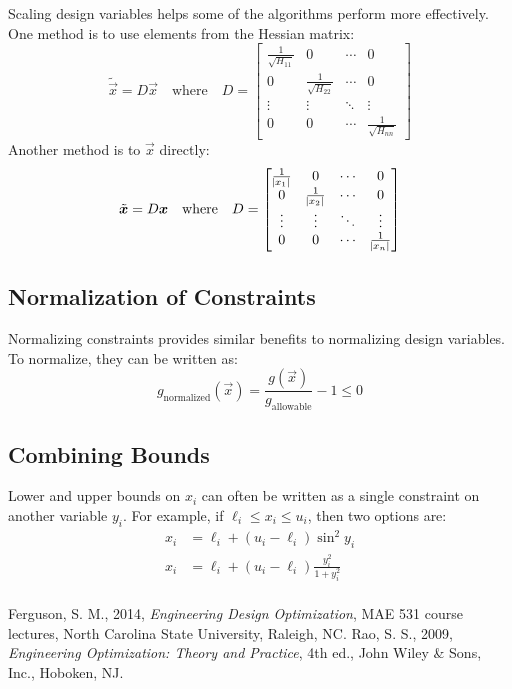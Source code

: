 \documentclass{article}
\begin{document}
Scaling design variables helps some of the algorithms perform more effectively. One method is to use
elements from the Hessian matrix:
\[\tilde{\vec{x}} = D \vec{x} \quad \textrm{where} \quad D =
\begin{bmatrix}
  \frac{1}{\sqrt{H_{11}}} & 0 & \cdots & 0 \\
  0 & \frac{1}{\sqrt{H_{22}}} & \cdots & 0 \\
  \vdots & \vdots & \ddots & \vdots \\
  0 & 0 & \cdots & \frac{1}{\sqrt{H_{nn}}}
\end{bmatrix}\]
Another method is to \(\vec{x}\) directly:
\[\tilde{\bm{x}} = D \bm{x} \quad \textrm{where} \quad D =
\begin{bmatrix}
  \frac{1}{\abs{x_1}} & 0 & \cdots & 0 \\
  0 & \frac{1}{\abs{x_2}} & \cdots & 0 \\
  \vdots & \vdots & \ddots & \vdots \\
  0 & 0 & \cdots & \frac{1}{\abs{x_n}}
\end{bmatrix}\]

\subsection{Normalization of Constraints}

Normalizing constraints provides similar benefits to normalizing design variables. To normalize,
they can be written as:
\[g_\textrm{normalized}(\vec{x}) = \frac{g(\vec{x})}{g_\textrm{allowable}} - 1 \le 0\]

\subsection{Combining Bounds}

Lower and upper bounds on \(x_i\) can often be written as a single constraint on another variable \(y_i\). For example, if \(\ell_i \le x_i \le u_i\), then two options are:
\begin{align*}
  x_i &= \ell_i + (u_i - \ell_i) \sin^2 y_i \\
  x_i &= \ell_i + (u_i - \ell_i) \frac{y_i^2}{1 + y_i^2} \\
\end{align*}

\begin{thebibliography}{99}
 Ferguson, S. M., 2014, \emph{Engineering Design Optimization}, MAE 531 course
  lectures, North Carolina State University, Raleigh, NC.
 Rao, S. S., 2009, \emph{Engineering Optimization: Theory and Practice}, 4th ed.,
  John Wiley \& Sons, Inc., Hoboken, NJ.
\end{thebibliography}
\end{document}
